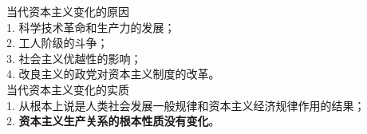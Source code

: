 当代资本主义变化的原因\\
1. 科学技术革命和生产力的发展；\\
2. 工人阶级的斗争；\\
3. 社会主义优越性的影响；\\
4.
改良主义的政党对资本主义制度的改革。\\[2\baselineskip]当代资本主义变化的实质\\
1. 从根本上说是人类社会发展一般规律和资本主义经济规律作用的结果；\\
{2. {\textbf{资本主义生产关系的根本性质没有变化}}。 }\\[2\baselineskip]
